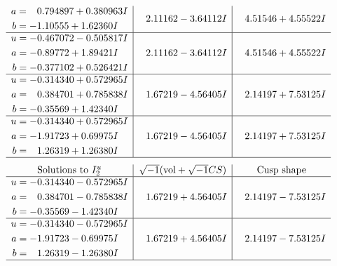 \documentclass[1p]{elsarticle_modified}
\theoremstyle{definition}
\newcommand{\I}{\sqrt{-1}}
\begin{document}
$$\begin{array}{c|c|c}
\begin{aligned}
a &= \phantom{-}0.794897 + 0.380963 I \\
b &= -1.10555 + 1.62360 I\end{aligned}
 & \phantom{-}2.11162 - 3.64112 I & \phantom{-}4.51546 + 4.55522 I \\ \hline\begin{aligned}
u &= -0.467072 - 0.505817 I \\
a &= -0.89772 + 1.89421 I \\
b &= -0.377102 + 0.526421 I\end{aligned}
 & \phantom{-}2.11162 - 3.64112 I & \phantom{-}4.51546 + 4.55522 I \\ \hline\begin{aligned}
u &= -0.314340 + 0.572965 I \\
a &= \phantom{-}0.384701 + 0.785838 I \\
b &= -0.35569 + 1.42340 I\end{aligned}
 & \phantom{-}1.67219 - 4.56405 I & \phantom{-}2.14197 + 7.53125 I \\ \hline\begin{aligned}
u &= -0.314340 + 0.572965 I \\
a &= -1.91723 + 0.69975 I \\
b &= \phantom{-}1.26319 + 1.26380 I\end{aligned}
 & \phantom{-}1.67219 - 4.56405 I & \phantom{-}2.14197 + 7.53125 I\\
 \hline 
 \end{array}$$\newpage$$\begin{array}{c|c|c}  
\text{Solutions to }I^u_{2}& \I (\text{vol} + \sqrt{-1}CS) & \text{Cusp shape}\\
 \hline 
\begin{aligned}
u &= -0.314340 - 0.572965 I \\
a &= \phantom{-}0.384701 - 0.785838 I \\
b &= -0.35569 - 1.42340 I\end{aligned}
 & \phantom{-}1.67219 + 4.56405 I & \phantom{-}2.14197 - 7.53125 I \\ \hline\begin{aligned}
u &= -0.314340 - 0.572965 I \\
a &= -1.91723 - 0.69975 I \\
b &= \phantom{-}1.26319 - 1.26380 I\end{aligned}
 & \phantom{-}1.67219 + 4.56405 I & \phantom{-}2.14197 - 7.53125 I\\
 \hline 
 \end{array}$$\newpage\newpage\renewcommand{\arraystretch}{1}
\end{document}

